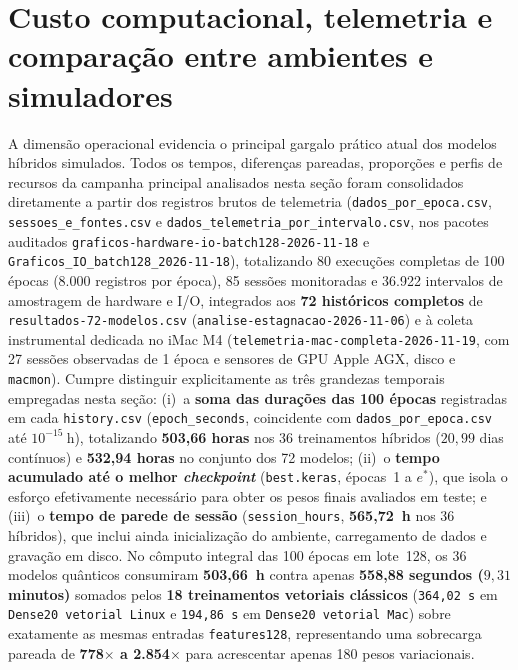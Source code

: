 \documentclass[
    12pt,
    openright,
    oneside,
    a4paper,
    english,
    brazil
]{abntex2}
\begin{document}
\section{Custo computacional, telemetria e comparação entre ambientes e simuladores}

A dimensão operacional evidencia o principal gargalo prático atual dos modelos híbridos simulados. Todos os tempos, diferenças pareadas, proporções e perfis de recursos da campanha principal analisados nesta seção foram consolidados diretamente a partir dos registros brutos de telemetria (\texttt{dados\_por\_epoca.csv}, \texttt{sessoes\_e\_fontes.csv} e \texttt{dados\_telemetria\_\allowbreak por\_intervalo.csv}, nos pacotes auditados \texttt{graficos-hardware-io-\allowbreak batch128-2026-11-18} e \texttt{Graficos\_IO\_batch128\_2026-11-18}), totalizando 80 execuções completas de 100 épocas (8.000 registros por época), 85 sessões monitoradas e 36.922 intervalos de amostragem de hardware e I/O, integrados aos \textbf{72 históricos completos} de \texttt{resultados-72-modelos.csv} (\texttt{analise-estagnacao-2026-11-06}) e à coleta instrumental dedicada no iMac M4 (\texttt{telemetria-mac-\allowbreak completa-2026-11-19}, com 27 sessões observadas de 1 época e sensores de GPU Apple AGX, disco e \texttt{macmon}). Cumpre distinguir explicitamente as três grandezas temporais empregadas nesta seção: (i)~a \textbf{soma das durações das 100 épocas} registradas em cada \texttt{history.csv} (\texttt{epoch\_seconds}, coincidente com \texttt{dados\_por\_epoca.csv} até \(10^{-15}~\text{h}\)), totalizando \textbf{503,66 horas} nos 36 treinamentos híbridos (\(20{,}99\) dias contínuos) e \textbf{532,94 horas} no conjunto dos 72 modelos; (ii)~o \textbf{tempo acumulado até o melhor \textit{checkpoint}} (\texttt{best.keras}, épocas~1 a \(e^*\)), que isola o esforço efetivamente necessário para obter os pesos finais avaliados em teste; e (iii)~o \textbf{tempo de parede de sessão} (\texttt{session\_hours}, \textbf{565,72~h} nos 36 híbridos), que inclui ainda inicialização do ambiente, carregamento de dados e gravação em disco. No cômputo integral das 100 épocas em lote~128, os 36 modelos quânticos consumiram \textbf{503,66~h} contra apenas \textbf{558,88 segundos (\(9{,}31\) minutos)} somados pelos \textbf{18 treinamentos vetoriais clássicos} (\texttt{364,02~s} em \texttt{Dense20 vetorial Linux} e \texttt{194,86~s} em \texttt{Dense20 vetorial Mac}) sobre exatamente as mesmas entradas \texttt{features128}, representando uma sobrecarga pareada de \textbf{778\(\times\) a 2.854\(\times\)} para acrescentar apenas 180 pesos variacionais.
\end{document}
